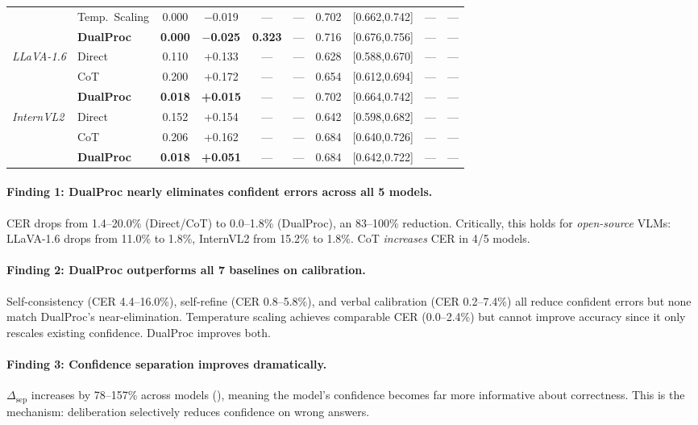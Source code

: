 \documentclass[10pt,twocolumn,letterpaper]{article}
\newcommand{\method}{DualProc}
\newcommand{\dsep}{\ensuremath{\Delta_{\text{sep}}}}
\begin{document}
\begin{table}[t]
{\begin{tabular}{ll cccc cccc}
& Temp.\ Scaling & 0.000 & $-$0.019 & --- & --- & 0.702 & [0.662,0.742] & --- & --- \\
& \textbf{\method{}} & \textbf{0.000} & \textbf{$-$0.025} & \textbf{0.323} & --- & 0.716 & [0.676,0.756] & --- & --- \\
\midrule
\multirow{3}{*}{\textit{LLaVA-1.6}} 
& Direct & 0.110 & +0.133 & --- & --- & 0.628 & [0.588,0.670] & --- & --- \\
& CoT & 0.200 & +0.172 & --- & --- & 0.654 & [0.612,0.694] & --- & --- \\
& \textbf{\method{}} & \textbf{0.018} & \textbf{+0.015} & --- & --- & 0.702 & [0.664,0.742] & --- & --- \\
\midrule
\multirow{3}{*}{\textit{InternVL2}} 
& Direct & 0.152 & +0.154 & --- & --- & 0.642 & [0.598,0.682] & --- & --- \\
& CoT & 0.206 & +0.162 & --- & --- & 0.684 & [0.640,0.726] & --- & --- \\
& \textbf{\method{}} & \textbf{0.018} & \textbf{+0.051} & --- & --- & 0.684 & [0.642,0.722] & --- & --- \\
\bottomrule
\end{tabular}
}
\end{table}

\paragraph{Finding 1: \method{} nearly eliminates confident errors across all 5 models.}
CER drops from 1.4--20.0\% (Direct/CoT) to 0.0--1.8\% (\method{}), an 83--100\% reduction. Critically, this holds for \emph{open-source} VLMs: LLaVA-1.6 drops from 11.0\% to 1.8\%, InternVL2 from 15.2\% to 1.8\%. CoT \emph{increases} CER in 4/5 models.

\paragraph{Finding 2: DualProc outperforms all 7 baselines on calibration.}
Self-consistency (CER 4.4--16.0\%), self-refine (CER 0.8--5.8\%), and verbal calibration (CER 0.2--7.4\%) all reduce confident errors but none match \method{}'s near-elimination. Temperature scaling achieves comparable CER (0.0--2.4\%) but cannot improve accuracy since it only rescales existing confidence. \method{} improves both.

\paragraph{Finding 3: Confidence separation improves dramatically.}
$\dsep$ increases by 78--157\% across models (), meaning the model's confidence becomes far more informative about correctness. This is the mechanism: deliberation selectively reduces confidence on wrong answers.
\end{document}
